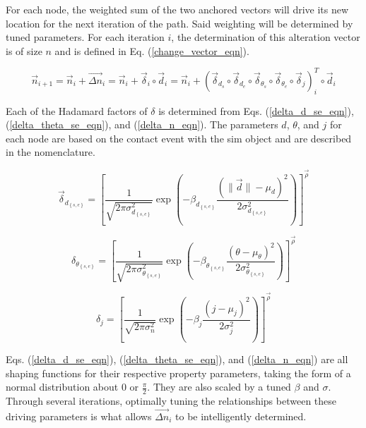 \documentclass[conf]{new-aiaa}
\begin{document}
For each node, the weighted sum of the two anchored vectors will drive its new location for the next iteration of the path. Said weighting will be determined by tuned parameters. For each iteration $i$, the determination of this alteration vector is of size $n$ and is defined in Eq. (\ref{change_vector_eqn}).

\begin{equation}
\label{change_vector_eqn}
\vec{n}_{i + 1} = \vec{n}_i + \vec{{\Delta}{n}}_i = \vec{n}_i + {\vec{\delta}}_i\circ{\vec{d}}_i = \vec{n}_i + \left({\vec{\delta}_{d_s}}\circ{\vec{\delta}_{d_e}}\circ{\vec{\delta}_{\theta_s}}\circ{\vec{\delta}_{\theta_e}}\circ{\vec{\delta}_j}\right)_i^T\circ{\vec{d}}_i
\end{equation}

Each of the Hadamard factors of $\delta$ is determined from Eqs. (\ref{delta_d_se_eqn}), (\ref{delta_theta_se_eqn}), and (\ref{delta_n_eqn}). The parameters $d$, $\theta$, and $j$ for each node are based on the contact event with the sim object and are described in the nomenclature.

\begin{equation}
\label{delta_d_se_eqn}
\vec{\delta}_{d_{\left\{s,e\right\}}} = \left[\frac{1}{\sqrt{2\pi{\sigma_{d_{\left\{s,e\right\}}}^2}}}\exp\left({-\beta_{d_{\left\{s,e\right\}}}\frac{{\left(\|{\vec{d}}\| - \mu_d\right)}^2}{2\sigma_{d_{\left\{s,e\right\}}}^2}}\right)\right]^{\vec{\rho}}
\end{equation}

\begin{equation}
\label{delta_theta_se_eqn}
\delta_{\theta_{\left\{s,e\right\}}} = \left[\frac{1}{\sqrt{2\pi\sigma_{\theta_{\left\{s,e\right\}}}^2}}\exp\left({-\beta_{\theta_{\left\{s,e\right\}}}\frac{{\left(\theta - \mu_\theta\right)}^2}{2\sigma_{\theta_{\left\{s,e\right\}}}^2}}\right)\right]^{\vec{\rho}}
\end{equation}

\begin{equation}
\label{delta_n_eqn}
\delta_j = \left[\frac{1}{\sqrt{2\pi\sigma_n^2}}\exp\left({-\beta_j\frac{{\left(j - \mu_j\right)}^2}{2\sigma_j^2}}\right)\right]^{\vec{\rho}}
\end{equation}

Eqs. (\ref{delta_d_se_eqn}), (\ref{delta_theta_se_eqn}), and (\ref{delta_n_eqn}) are all shaping functions for their respective property parameters, taking the form of a normal distribution about $0$ or $\frac{\pi}{2}$. They are also scaled by a tuned $\beta$ and $\sigma$. Through several iterations, optimally tuning the relationships between these driving parameters is what allows $\vec{{\Delta}{n}}_i$ to be intelligently determined.
\end{document}
